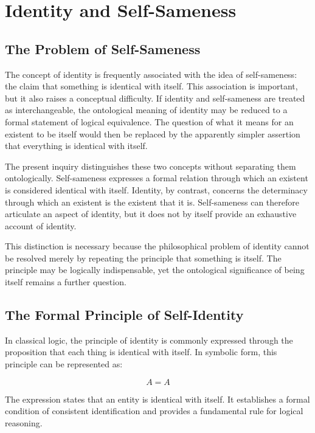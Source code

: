 
\section{Identity and Self-Sameness}
\label{sec:identity-and-self-sameness}

\subsection{The Problem of Self-Sameness}

The concept of identity is frequently associated with the idea of self-sameness: the claim that something is identical with itself. This association is important, but it also raises a conceptual difficulty. If identity and self-sameness are treated as interchangeable, the ontological meaning of identity may be reduced to a formal statement of logical equivalence. The question of what it means for an existent to be itself would then be replaced by the apparently simpler assertion that everything is identical with itself.

The present inquiry distinguishes these two concepts without separating them ontologically. Self-sameness expresses a formal relation through which an existent is considered identical with itself. Identity, by contrast, concerns the determinacy through which an existent is the existent that it is. Self-sameness can therefore articulate an aspect of identity, but it does not by itself provide an exhaustive account of identity.

This distinction is necessary because the philosophical problem of identity cannot be resolved merely by repeating the principle that something is itself. The principle may be logically indispensable, yet the ontological significance of being itself remains a further question.

\subsection{The Formal Principle of Self-Identity}

In classical logic, the principle of identity is commonly expressed through the proposition that each thing is identical with itself. In symbolic form, this principle can be represented as:

\[
A = A
\]

The expression states that an entity is identical with itself. It establishes a formal condition of consistent identification and provides a fundamental rule for logical reasoning.

